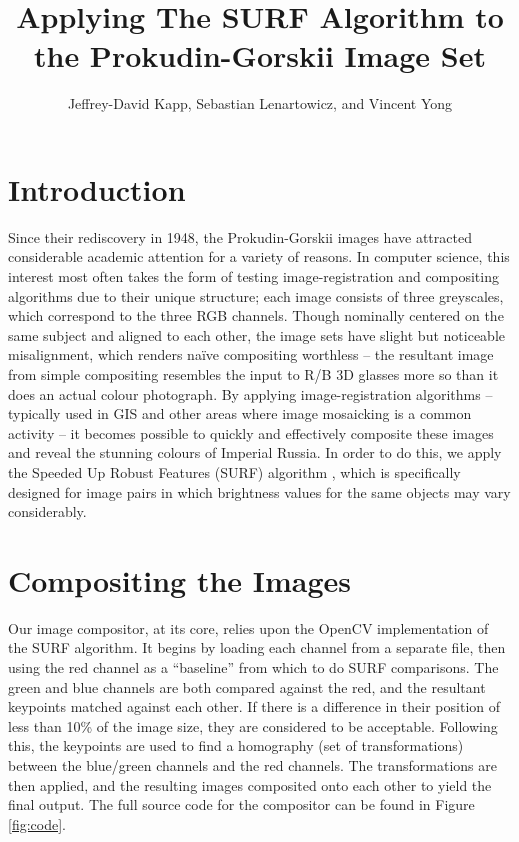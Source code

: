 \documentclass[10pt]{IEEEtran}
\title{Applying The SURF Algorithm to the Prokudin-Gorskii Image Set}
\author{Jeffrey-David Kapp, Sebastian Lenartowicz, and Vincent Yong}
\begin{document}
\maketitle

	\section{Introduction}
	Since their rediscovery in 1948, the Prokudin-Gorskii images have attracted considerable academic attention for a variety of reasons. In computer science, this interest most often takes the form of testing image-registration and compositing algorithms \cite{minachin2007reconstruction} due to their unique structure; each image consists of three greyscales, which correspond to the three RGB channels. Though nominally centered on the same subject and aligned to each other, the image sets have slight but noticeable misalignment, which renders na\"ive compositing worthless -- the resultant image from simple compositing resembles the input to R/B 3D glasses more so than it does an actual colour photograph. By applying image-registration algorithms -- typically used in GIS and other areas where image mosaicking is a common activity -- it becomes possible to quickly and effectively composite these images and reveal the stunning colours of Imperial Russia. In order to do this, we apply the Speeded Up Robust Features (SURF) algorithm \cite{bay2006surf}, which is specifically designed for image pairs in which brightness values for the same objects may vary considerably.

	\section{Compositing the Images}
		Our image compositor, at its core, relies upon the OpenCV implementation of the SURF algorithm. It begins by loading each channel from a separate file, then using the red channel as a ``baseline'' from which to do SURF comparisons. The green and blue channels are both compared against the red, and the resultant keypoints matched against each other. If there is a difference in their position of less than 10\% of the image size, they are considered to be acceptable. Following this, the keypoints are used to find a homography (set of transformations) between the blue/green channels and the red channels. The transformations are then applied, and the resulting images composited onto each other to yield the final output. The full source code for the compositor can be found in Figure \ref{fig:code}.
\end{document}
